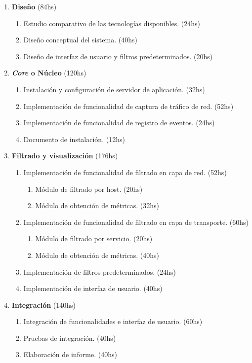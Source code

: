 \begin{enumerate}
	\item \textbf{Diseño} (84hs)
	\begin{enumerate}
		\item Estudio comparativo de las tecnologías disponibles. (24hs)
		\item Diseño conceptual del sistema. (40hs)
		\item Diseño de interfaz de usuario y filtros predeterminados. (20hs)
	\end{enumerate}
	\item \textbf{\textit{Core} o Núcleo} (120hs)
	\begin{enumerate}
		\item Instalación y configuración de servidor de aplicación. (32hs)
		\item Implementación de funcionalidad de captura de tráfico de red. (52hs)
		\item Implementación de funcionalidad de registro de eventos. (24hs)
		\item Documento de instalación. (12hs)
	\end{enumerate}
	\item \textbf{Filtrado y visualización} (176hs)
	\begin{enumerate}
		\item Implementación de funcionalidad de filtrado en capa de red. (52hs)
		\begin{enumerate}
			\item Módulo de filtrado por host. (20hs)
			\item Módulo de obtención de métricas. (32hs)
		\end{enumerate}
		\item Implementación de funcionalidad de filtrado en capa de transporte. (60hs)
		\begin{enumerate}
			\item Módulo de filtrado por servicio. (20hs)
			\item Módulo de obtención de métricas. (40hs)
		\end{enumerate}
		\item Implementación de filtros predeterminados. (24hs)
		\item Implementación de interfaz de usuario. (40hs)
	\end{enumerate}
	\item \textbf{Integración} (140hs)
	\begin{enumerate}
		\item Integración de funcionalidades e interfaz de usuario. (60hs)
		\item Pruebas de integración. (40hs)
		\item Elaboración de informe. (40hs)
	\end{enumerate}
\end{enumerate}


